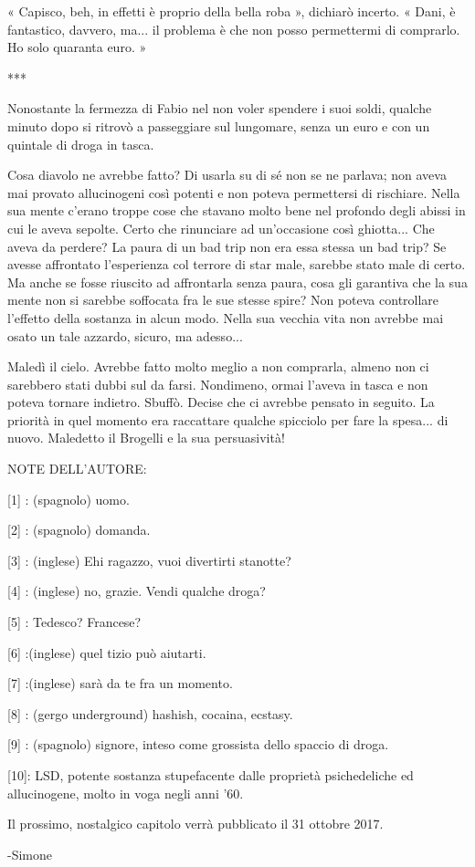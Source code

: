 « Capisco, beh, in effetti è proprio della bella roba », dichiarò incerto. « Dani, è fantastico, davvero, ma... il problema è che non posso permettermi di comprarlo. Ho solo quaranta euro. »

***

Nonostante la fermezza di Fabio nel non voler spendere i suoi soldi, qualche minuto dopo si ritrovò a passeggiare sul lungomare, senza un euro e con un quintale di droga in tasca.

Cosa diavolo ne avrebbe fatto? Di usarla su di sé non se ne parlava; non aveva mai provato allucinogeni così potenti e non poteva permettersi di rischiare. Nella sua mente c'erano troppe cose che stavano molto bene nel profondo degli abissi in cui le aveva sepolte. Certo che rinunciare ad un'occasione così ghiotta... Che aveva da perdere? La paura di un bad trip non era essa stessa un bad trip? Se avesse affrontato l'esperienza col terrore di star male, sarebbe stato male di certo. Ma anche se fosse riuscito ad affrontarla senza paura, cosa gli garantiva che la sua mente non si sarebbe soffocata fra le sue stesse spire? Non poteva controllare l'effetto della sostanza in alcun modo. Nella sua vecchia vita non avrebbe mai osato un tale azzardo, sicuro, ma adesso...

Maledì il cielo. Avrebbe fatto molto meglio a non comprarla, almeno non ci sarebbero stati dubbi sul da farsi. Nondimeno, ormai l'aveva in tasca e non poteva tornare indietro. Sbuffò. Decise che ci avrebbe pensato in seguito. La priorità in quel momento era raccattare qualche spicciolo per fare la spesa... di nuovo. Maledetto il Brogelli e la sua persuasività!


NOTE DELL'AUTORE:

[1] : (spagnolo) uomo.

[2] : (spagnolo) domanda.

[3] : (inglese) Ehi ragazzo, vuoi divertirti stanotte?

[4] : (inglese) no, grazie. Vendi qualche droga?

[5] : Tedesco? Francese?

[6] :(inglese) quel tizio può aiutarti.

[7] :(inglese) sarà da te fra un momento.

[8] : (gergo underground) hashish, cocaina, ecstasy. 

[9] : (spagnolo) signore, inteso come grossista dello spaccio di droga.

[10]: LSD, potente sostanza stupefacente dalle proprietà psichedeliche ed allucinogene, molto in voga negli anni '60.


Il prossimo, nostalgico capitolo verrà pubblicato il 31 ottobre 2017.

-Simone



